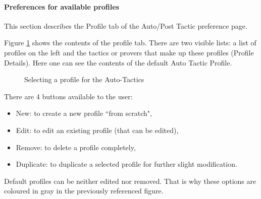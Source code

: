 

\paragraph{Preferences for available profiles}

This section describes the \textsf{Profile} tab of the \textsf{Auto/Post Tactic} preference page. 

Figure \ref{fig_ref_01_preferences9} shows the contents of the profile tab. There are two visible lists: a list of profiles on the left and the tactics or provers that make up these profiles (Profile Details). Here one can see the contents of the default Auto Tactic Profile.

\begin{figure}[!ht]
\begin{center}
	\caption{Selecting a profile for the Auto-Tactics}
	\label{fig_ref_01_preferences9}
\end{center}
\end{figure}

There are 4 buttons available to the user:

\begin{itemize}
	\item New: to create a new profile ``from scratch",
	\item Edit: to edit an existing profile (that can be edited),
	\item Remove: to delete a profile completely,
	\item Duplicate: to duplicate a selected profile for further slight modification.
\end{itemize}

Default profiles can be neither edited nor removed. That is why these options are coloured in gray in the previously referenced figure.

